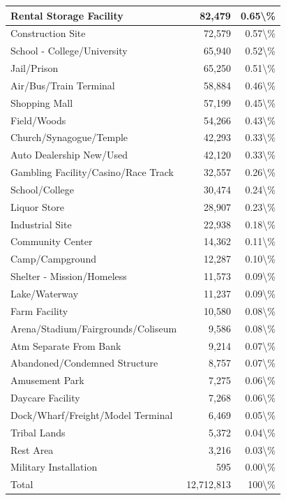 \documentclass[
]{krantz}
\begin{document}
\begin{longtable}[t]{l|r|r}
\hline
Rental Storage Facility & 82,479 & 0.65\textbackslash{}\%\\
\hline
Construction Site & 72,579 & 0.57\textbackslash{}\%\\
\hline
School - College/University & 65,940 & 0.52\textbackslash{}\%\\
\hline
Jail/Prison & 65,250 & 0.51\textbackslash{}\%\\
\hline
Air/Bus/Train Terminal & 58,884 & 0.46\textbackslash{}\%\\
\hline
Shopping Mall & 57,199 & 0.45\textbackslash{}\%\\
\hline
Field/Woods & 54,266 & 0.43\textbackslash{}\%\\
\hline
Church/Synagogue/Temple & 42,293 & 0.33\textbackslash{}\%\\
\hline
Auto Dealership New/Used & 42,120 & 0.33\textbackslash{}\%\\
\hline
Gambling Facility/Casino/Race Track & 32,557 & 0.26\textbackslash{}\%\\
\hline
School/College & 30,474 & 0.24\textbackslash{}\%\\
\hline
Liquor Store & 28,907 & 0.23\textbackslash{}\%\\
\hline
Industrial Site & 22,938 & 0.18\textbackslash{}\%\\
\hline
Community Center & 14,362 & 0.11\textbackslash{}\%\\
\hline
Camp/Campground & 12,287 & 0.10\textbackslash{}\%\\
\hline
Shelter - Mission/Homeless & 11,573 & 0.09\textbackslash{}\%\\
\hline
Lake/Waterway & 11,237 & 0.09\textbackslash{}\%\\
\hline
Farm Facility & 10,580 & 0.08\textbackslash{}\%\\
\hline
Arena/Stadium/Fairgrounds/Coliseum & 9,586 & 0.08\textbackslash{}\%\\
\hline
Atm Separate From Bank & 9,214 & 0.07\textbackslash{}\%\\
\hline
Abandoned/Condemned Structure & 8,757 & 0.07\textbackslash{}\%\\
\hline
Amusement Park & 7,275 & 0.06\textbackslash{}\%\\
\hline
Daycare Facility & 7,268 & 0.06\textbackslash{}\%\\
\hline
Dock/Wharf/Freight/Model Terminal & 6,469 & 0.05\textbackslash{}\%\\
\hline
Tribal Lands & 5,372 & 0.04\textbackslash{}\%\\
\hline
Rest Area & 3,216 & 0.03\textbackslash{}\%\\
\hline
Military Installation & 595 & 0.00\textbackslash{}\%\\
\hline
Total & 12,712,813 & 100\textbackslash{}\%\\
\hline
\end{longtable}
\end{document}
